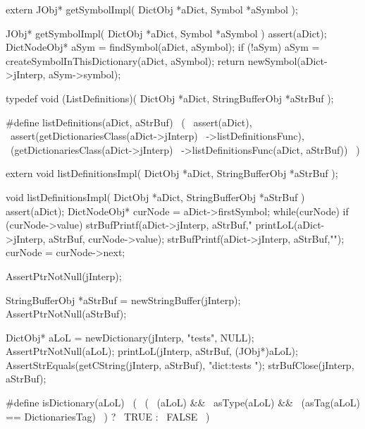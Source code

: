 \startCHeader
extern JObj* getSymbolImpl(
  DictObj *aDict,
  Symbol  *aSymbol
);
\stopCHeader
{}

\startCCode
JObj* getSymbolImpl(
  DictObj *aDict,
  Symbol  *aSymbol
) {
  assert(aDict);
  DictNodeObj* aSym = findSymbol(aDict, aSymbol);
  if (!aSym) {
    aSym = createSymbolInThisDictionary(aDict, aSymbol);
  }
  return newSymbol(aDict->jInterp, aSym->symbol);
}
\stopCCode
\stopTestSuite

\startTestSuite[listDefinitions]

\startCHeader
typedef void (ListDefinitions)(
  DictObj         *aDict,
  StringBufferObj *aStrBuf
);

#define listDefinitions(aDict, aStrBuf)         \
  (                                             \
    assert(aDict),                              \
    assert(getDictionariesClass(aDict->jInterp) \
      ->listDefinitionsFunc),                   \
    (getDictionariesClass(aDict->jInterp)       \
      ->listDefinitionsFunc(aDict, aStrBuf))    \
  )
\stopCHeader

\setCHeaderStream{private}
\startCHeader
extern void listDefinitionsImpl(
  DictObj         *aDict,
  StringBufferObj *aStrBuf
);
\stopCHeader
\setCHeaderStream{public}

\startCCode
void listDefinitionsImpl(
  DictObj         *aDict,
  StringBufferObj *aStrBuf
) {
  assert(aDict);
  DictNodeObj* curNode = aDict->firstSymbol;
  while(curNode) {
    if (curNode->value) {
      strBufPrintf(aDict->jInterp, aStrBuf,"%
      printLoL(aDict->jInterp, aStrBuf, curNode->value);
      strBufPrintf(aDict->jInterp, aStrBuf,"\n");
    }
    curNode = curNode->next;
  }
}
\stopCCode

\startTestCase[print Dictionary]
\startCTest
  AssertPtrNotNull(jInterp);

  StringBufferObj *aStrBuf = newStringBuffer(jInterp);
  AssertPtrNotNull(aStrBuf);

  DictObj* aLoL = newDictionary(jInterp, "tests", NULL);
  AssertPtrNotNull(aLoL);
  printLoL(jInterp, aStrBuf, (JObj*)aLoL);
  AssertStrEquals(getCString(jInterp, aStrBuf), "dict:tests ");
  strBufClose(jInterp, aStrBuf);
\stopCTest
\stopTestCase
\stopTestSuite

\startTestSuite[isDictionary]
\startCHeader
#define isDictionary(aLoL)              \
  (                                     \
    (                                   \
      (aLoL) &&                         \
      asType(aLoL) &&                   \
      (asTag(aLoL) == DictionariesTag)  \
    ) ?                                 \
      TRUE :                            \
      FALSE                             \
  )
\stopCHeader
\stopTestSuite

